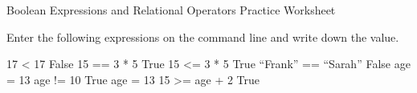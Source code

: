 Boolean Expressions and Relational Operators Practice Worksheet

Enter the following expressions on the command line and write down the value.


17 < 17
	False
15 == 3 * 5
	True
15 <= 3 * 5
	True
“Frank” == “Sarah”
	False
age = 13
age != 10	
  True
age = 13
15 >= age + 2	
  True

